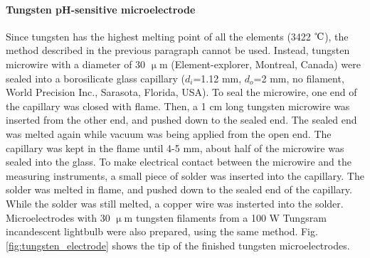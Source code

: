 \paragraph{Tungsten pH-sensitive microelectrode}
Since tungsten has the highest melting point of all the elements (3422 $\celsius$), the method described in the previous paragraph cannot be used.
Instead, tungsten microwire with a diameter of 30 $\upmu$m (Element-explorer, Montreal, Canada) were sealed into a borosilicate glass capillary ($d_i$=1.12 mm, $d_o$=2 mm, no filament, World Precision Inc., Sarasota, Florida, USA).
To seal the microwire, one end of the capillary was closed with flame.
Then, a 1 cm long tungsten microwire was inserted from the other end, and pushed down to the sealed end.
The sealed end was melted again while vacuum was being applied from the open end.
The capillary was kept in the flame until 4-5 mm, about half of the microwire was sealed into the glass.
To make electrical contact between the microwire and the measuring instruments, a small piece of solder was inserted into the capillary.
The solder was melted in flame, and pushed down to the sealed end of the capillary.
While the solder was still melted, a copper wire was insterted into the solder.
Microelectrodes with 30 $\upmu$m tungsten filaments from a 100 W Tungsram incandescent lightbulb were also prepared, using the same method.
Fig. \ref{fig:tungsten_electrode} shows the tip of the finished tungsten microelectrodes.

